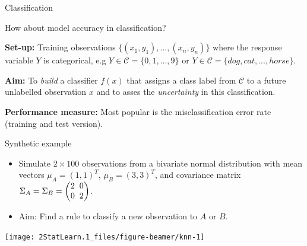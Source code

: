 \documentclass[ignorenonframetext,]{beamer}
\begin{document}
\begin{frame}{Classification}

\vspace{2mm} How about model accuracy in classification? \vspace{2mm}

\textbf{Set-up:} Training observations
\(\{(x_1, y_1), ..., (x_n, y_n)\}\) where the response variable \(Y\) is
categorical, e.g \(Y \in \mathcal{C} = \{0, 1, ..., 9\}\) or
\(Y \in \mathcal{C} = \{dog, cat,... ,horse\}\).

\textbf{Aim: } To \emph{build} a classifier \(f(x)\) that assigns a
class label from \(\mathcal{C}\) to a future unlabelled observation
\(x\) and to asses the \emph{uncertainty} in this classification.

\textbf{Performance measure:} Most popular is the misclassification
error rate (training and test version).

\end{frame}

\begin{frame}

\begin{block}{Synthetic example}

\begin{itemize}
\item
  Simulate \(2\times 100\) observations from a bivariate normal
  distribution with mean vectors \(\mu_A = (1, 1)^T\),
  \(\mu_B = (3, 3)^T\), and covariance matrix
  \(\Sigma_A = \Sigma_B = \begin{pmatrix} 2\hspace{2mm} 0 \\ 0 \hspace{2mm} 2 \end{pmatrix}\).
\item
  Aim: Find a rule to classify a new observation to \(A\) or \(B\).
\end{itemize}

\begin{center}\texttt{[image: 2StatLearn.1\_files/figure-beamer/knn-1]} \end{center}

\end{block}

\end{frame}
\end{document}
